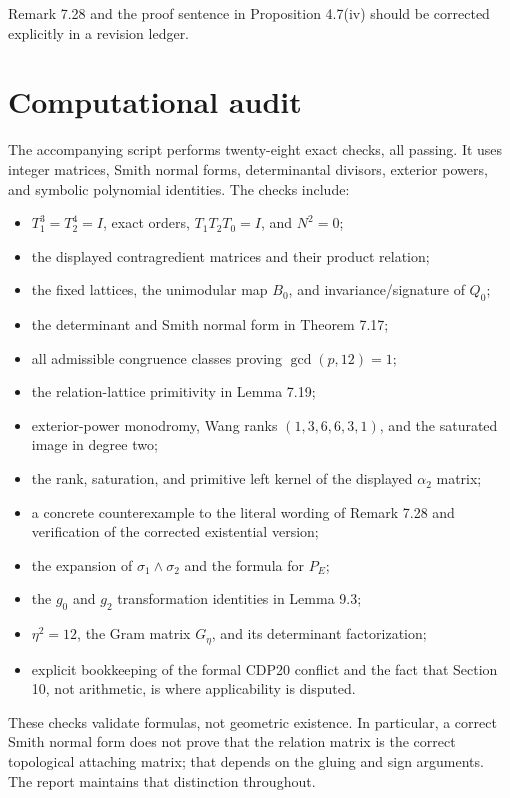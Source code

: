 \documentclass[
  10pt,
  letterpaper,
]{article}
\providecommand{\tightlist}{%
  \setlength{\itemsep}{0pt}\setlength{\parskip}{0pt}}
\begin{document}
Remark 7.28 and the proof sentence in Proposition 4.7(iv) should be
corrected explicitly in a revision ledger.

\section{Computational audit}\label{computational-audit}

The accompanying script performs twenty-eight exact checks, all passing.
It uses integer matrices, Smith normal forms, determinantal divisors,
exterior powers, and symbolic polynomial identities. The checks include:

\begin{itemize}
\tightlist
\item
  \(T_1^3=T_2^4=I\), exact orders, \(T_1T_2T_0=I\), and \(N^2=0\);
\item
  the displayed contragredient matrices and their product relation;
\item
  the fixed lattices, the unimodular map \(B_0\), and
  invariance/signature of \(Q_0\);
\item
  the determinant and Smith normal form in Theorem 7.17;
\item
  all admissible congruence classes proving \(\gcd(p,12)=1\);
\item
  the relation-lattice primitivity in Lemma 7.19;
\item
  exterior-power monodromy, Wang ranks \((1,3,6,6,3,1)\), and the
  saturated image in degree two;
\item
  the rank, saturation, and primitive left kernel of the displayed
  \(\alpha_2\) matrix;
\item
  a concrete counterexample to the literal wording of Remark 7.28 and
  verification of the corrected existential version;
\item
  the expansion of \(\sigma_1\wedge\sigma_2\) and the formula for
  \(P_E\);
\item
  the \(g_0\) and \(g_2\) transformation identities in Lemma 9.3;
\item
  \(\eta^2=12\), the Gram matrix \(G_\eta\), and its determinant
  factorization;
\item
  explicit bookkeeping of the formal CDP20 conflict and the fact that
  Section 10, not arithmetic, is where applicability is disputed.
\end{itemize}

These checks validate formulas, not geometric existence. In particular,
a correct Smith normal form does not prove that the relation matrix is
the correct topological attaching matrix; that depends on the gluing and
sign arguments. The report maintains that distinction throughout.
\end{document}

